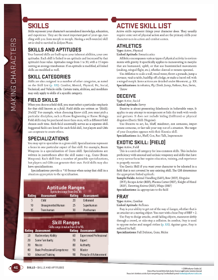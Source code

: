\begin{figure}[htb!]%
   \centering
   \includegraphics[scale=1.1]{gfx/dice-skills-ranges}%
\end{figure}%

